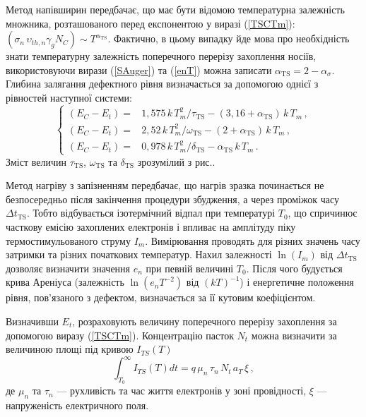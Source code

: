 \documentclass[10pt,a5paper,titlepage,oneside]{book}
\numberwithin{equation}{part}
\begin{document}
Метод напівширин передбачає, що має бути відомою температурна залежність
множника, розташованого перед експонентою у виразі (\ref{TSCTm}):
$(\sigma_n\,\upsilon_{th,n}\gamma_g N_C)\sim T^{\alpha_{\mathrm{TS}}}$.
Фактично, в цьому випадку йде мова про необхідність знати температурну залежність
поперечного перерізу захоплення носіїв,
використовуючи вирази (\ref{SAuger}) та (\ref{enT}) можна записати $\alpha_{\mathrm{TS}}=2-\alpha_\sigma$.
Глибина залягання дефектного рівня визначається
за допомогою однієї з рівностей наступної системи:
\begin{equation}\label{TSCsemi}
\left\{
\begin{aligned}%
(E_C-E_t)=&1,575\,k\,T_m^2/\tau_{\mathrm{TS}} -(3,16+\alpha_{\mathrm{TS}})\,k\,T_m\,,\\
(E_C-E_t)=&2,52\,k\,T_m^2/\omega_{\mathrm{TS}} -(2+\alpha_{\mathrm{TS}})\,k\,T_m\,,\\
(E_C-E_t)=&0,978\,k\,T_m^2/\delta_{\mathrm{TS}} -\alpha_{\mathrm{TS}}\,k\,T_m\,.
\end{aligned} \right.
\end{equation}
Зміст величин $\tau_{\mathrm{TS}}$, $\omega_{\mathrm{TS}}$ та $\delta_{\mathrm{TS}}$
зрозумілий з рис..

Метод нагріву з запізненням передбачає,
що нагрів зразка починається не безпосередньо після закінчення
процедури збудження,
а через проміжок часу $\Delta t_\mathrm{TS}$.
Тобто відбувається ізотермічний відпал при температурі $T_0$,
що спричинює часткову емісію захоплених електронів і впливає
на амплітуду піку термостимульованого струму $I_m$.
Вимірювання проводять для різних значень часу
затримки та різних початкових температур.
Нахил залежності $\ln(I_m)$ від $\Delta t_\mathrm{TS}$
дозволяє визначити значення $e_n$ при певній величині $T_0$.
Після чого будується крива Ареніуса
(залежність $\ln(e_nT^{-2})$ від $(kT)^{-1}$) і енергетичне
положення рівня, пов'язаного з дефектом, визначається за її кутовим
коефіцієнтом.

Визначивши $E_t$, розраховують величину поперечного перерізу захоплення за допомогою виразу (\ref{TSCTm}).
Концентрацію пасток $N_t$ можна визначити за величиною площі під
кривою $I_{TS}(T)$
\begin{equation}
\label{TSCNt}
\int_{T_0}^\infty I_{TS}(T) dt=q\,\mu_n\,\tau_n\,N_t\,a_T\,\xi\,,
\end{equation}
де
$\mu_n$ та $\tau_n$ --- рухливість та час життя електронів у зоні провідності,
$\xi$ --- напруженість електричного поля.
\end{document}
